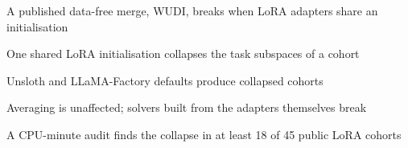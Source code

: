 \item A published data-free merge, WUDI, breaks when LoRA adapters share an initialisation
\item One shared LoRA initialisation collapses the task subspaces of a cohort
\item Unsloth and LLaMA-Factory defaults produce collapsed cohorts
\item Averaging is unaffected; solvers built from the adapters themselves break
\item A CPU-minute audit finds the collapse in at least 18 of 45 public LoRA cohorts
